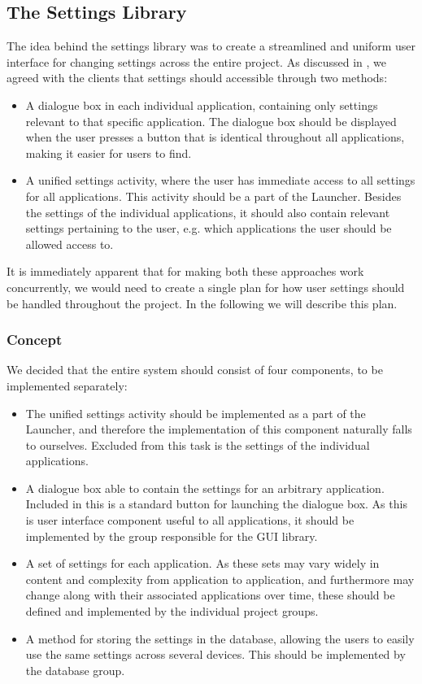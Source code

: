 \subsection{The Settings Library}
The idea behind the settings library was to create a streamlined and uniform user interface for changing settings across the entire \giraf project. As discussed in , we agreed with the clients that settings should accessible through two methods:
\begin{itemize}
	\item A dialogue box in each individual application, containing only settings relevant to that specific application. The dialogue box should be displayed when the user presses a button that is identical throughout all \giraf applications, making it easier for users to find.
	\item A unified settings activity, where the user has immediate access to all settings for all \giraf applications. This activity should be a part of the Launcher. Besides the settings of the individual applications, it should also contain relevant settings pertaining to the user, e.g. which applications the user should be allowed access to.
\end{itemize}

It is immediately apparent that for making both these approaches work concurrently, we would need to create a single plan for how user settings should be handled throughout the \giraf project. In the following we will describe this plan.

\subsubsection{Concept}
We decided that the entire system should consist of four components, to be implemented separately:
\begin{itemize}
	\item The unified settings activity should be implemented as a part of the Launcher, and therefore the implementation of this component naturally falls to ourselves. Excluded from this task is the settings of the individual applications.
	\item A dialogue box able to contain the settings for an arbitrary \giraf application. Included in this is a standard button for launching the dialogue box. As this is user interface component useful to all applications, it should be implemented by the group responsible for the \giraf GUI library.
	\item A set of settings for each \giraf application. As these sets may vary widely in content and complexity from application to application, and furthermore may change along with their associated applications over time, these should be defined and implemented by the individual project groups. 
	\item A method for storing the settings in the database, allowing the users to easily use the same settings across several devices. This should be implemented by the database group. 
\end{itemize}

